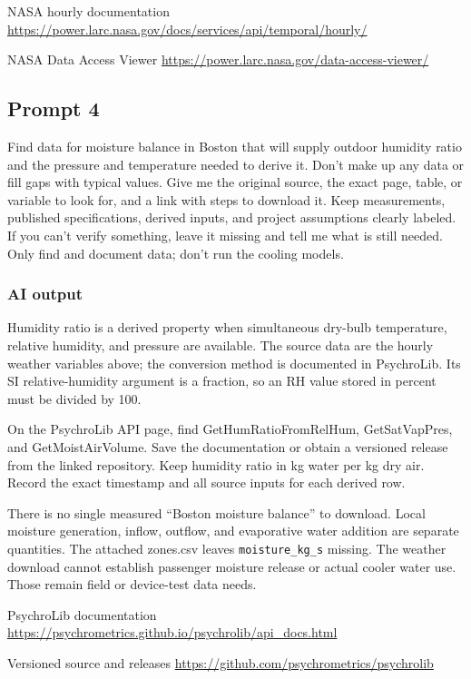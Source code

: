 NASA hourly documentation  \url{https://power.larc.nasa.gov/docs/services/api/temporal/hourly/}

NASA Data Access Viewer  \url{https://power.larc.nasa.gov/data-access-viewer/}

\subsection*{Prompt 4}
Find data for moisture balance in Boston that will supply outdoor humidity ratio and the pressure and temperature needed to derive it. Don’t make up any data or fill gaps with typical values. Give me the original source, the exact page, table, or variable to look for, and a link with steps to download it. Keep measurements, published specifications, derived inputs, and project assumptions clearly labeled. If you can’t verify something, leave it missing and tell me what is still needed. Only find and document data; don’t run the cooling models.

\subsubsection*{AI output}
Humidity ratio is a derived property when simultaneous dry-bulb temperature, relative humidity, and pressure are available. The source data are the hourly weather variables above; the conversion method is documented in PsychroLib. Its SI relative-humidity argument is a fraction, so an RH value stored in percent must be divided by 100.

On the PsychroLib API page, find GetHumRatioFromRelHum, GetSatVapPres, and GetMoistAirVolume. Save the documentation or obtain a versioned release from the linked repository. Keep humidity ratio in kg water per kg dry air. Record the exact timestamp and all source inputs for each derived row.

There is no single measured “Boston moisture balance” to download. Local moisture generation, inflow, outflow, and evaporative water addition are separate quantities. The attached zones.csv leaves \nolinkurl{moisture_kg_s} missing. The weather download cannot establish passenger moisture release or actual cooler water use. Those remain field or device-test data needs.

PsychroLib documentation  \url{https://psychrometrics.github.io/psychrolib/api_docs.html}

Versioned source and releases  \url{https://github.com/psychrometrics/psychrolib}

